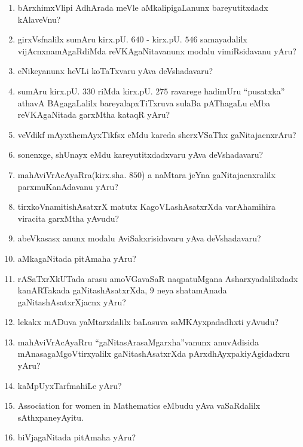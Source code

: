 \begin{enumerate}
\item bArxhimxVlipi AdhArada meVle aMkalipigaLanunx bareyutitxdadx kAlaveVnu? 
  
\item girxVsfnalilx sumAru kirx.pU. $640$ - kirx.pU. $546$ samayadalilx vijAcnxna\-mAgaRdiMda reVKAgaNitavanunx modalu vimiRsidavanu yAru?
  
\item eNikeyanunx heVLi koTaTxvaru yAva deVshadavaru?

\item sumAru kirx.pU. $330$ riMda kirx.pU. $275$ ravarege hadimUru ``pusatxka'' athavA BAgagaLalilx bareyalapxTiTxruva sulaBa pAThagaLu eMba reVKAgaNitada garxMtha kataqR yAru?
  
\item veVdikf mAyxthemAyxTikfsx eMdu kareda sherxVSaThx gaNitajacnxrAru?
  
\item sonenxge, shUnayx eMdu kareyutitxdadxvaru yAva deVshadavaru?
  
\item mahAviVrAcAyaRra(kirx.sha. $850$) a naMtara jeYna gaNitajacnxralilx parxmuKanAdavanu yAru?
  
\item tirxkoVnamitishAsatxrX matutx KagoVLashAsatxrXda varAhamihira viracita garxMtha yAvudu?
  
\item abeVkasasx anunx modalu AviSakxrisidavaru yAva deVshadavaru?
  
\item aMkagaNitada pitAmaha yAru?

\item rASaTxrXkUTada arasu amoVGavaSaR naqpatuMgana Asharxyadalilxdadx kanARTakada gaNitashAsatxrXda, $9$ neya shatamAnada gaNitashAsatxrXjacnx yAru?

\item lekakx mADuva yaMtarxdalilx baLasuva saMKAyxpadadhxti yAvudu?
  
\item mahAviVrAcAyaRru ``gaNitasArasaMgarxha''vanunx anuvAdisida mAnasagaMgoVtirxyalilx gaNitashAsatxrXda pArxdhAyxpakiyAgidadxru yAru? 
  
\item kaMpUyxTarfmahiLe yAru?
  
\item {\rm Association for women in Mathematics} eMbudu yAva vaSaRdalilx sAthxpaneyAyitu.
  
\item biVjagaNitada pitAmaha yAru?
  

\end{enumerate}
